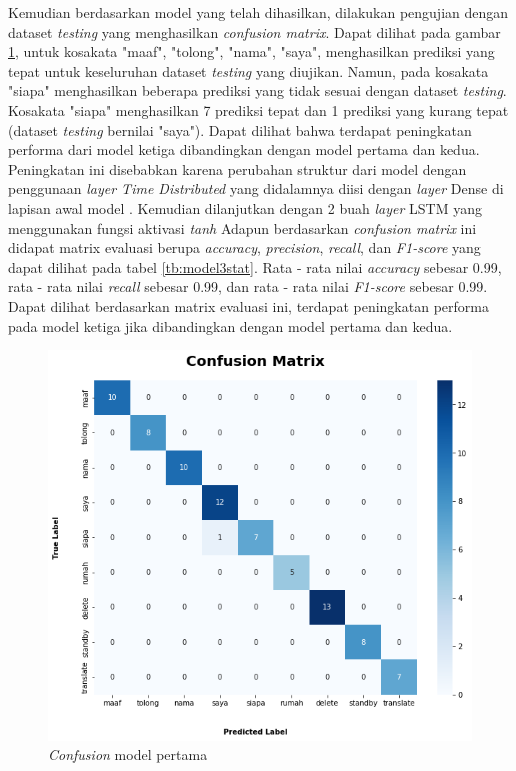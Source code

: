 Kemudian berdasarkan model yang telah dihasilkan, dilakukan pengujian dengan dataset \emph{testing} yang menghasilkan \emph{confusion matrix}. Dapat dilihat pada gambar \ref{fig:model3-cf}, untuk kosakata "maaf", "tolong", "nama", "saya",  menghasilkan prediksi yang tepat untuk keseluruhan dataset \emph{testing} yang diujikan. Namun, pada kosakata "siapa" menghasilkan beberapa prediksi yang tidak sesuai dengan dataset \emph{testing}. Kosakata "siapa" menghasilkan 7 prediksi tepat dan 1 prediksi yang kurang tepat (dataset \emph{testing} bernilai "saya"). Dapat dilihat bahwa terdapat peningkatan performa dari model ketiga dibandingkan dengan model pertama dan kedua. Peningkatan ini disebabkan karena perubahan struktur dari model dengan penggunaan \emph{layer Time Distributed} yang didalamnya diisi dengan \emph{layer} Dense di lapisan awal model
. Kemudian dilanjutkan dengan 2 buah \emph{layer} LSTM yang menggunakan fungsi aktivasi \emph{tanh} Adapun berdasarkan \emph{confusion matrix} ini didapat matrix evaluasi berupa \emph{accuracy}, \emph{precision}, \emph{recall}, dan \emph{F1-score} yang dapat dilihat pada tabel \ref{tb:model3stat}. Rata - rata nilai \emph{accuracy} sebesar 0.99, rata - rata nilai \emph{recall} sebesar 0.99, dan rata - rata nilai \emph{F1-score} sebesar 0.99. Dapat dilihat berdasarkan matrix evaluasi ini, terdapat peningkatan performa pada model ketiga jika dibandingkan dengan model pertama dan kedua.

\begin{figure}[H]
  \centering

  \includegraphics[scale=0.6]{gambar/bab4-uji-model-best-cf.png}

  \caption{\emph{Confusion} model pertama}
  \label{fig:model3-cf}
\end{figure}

